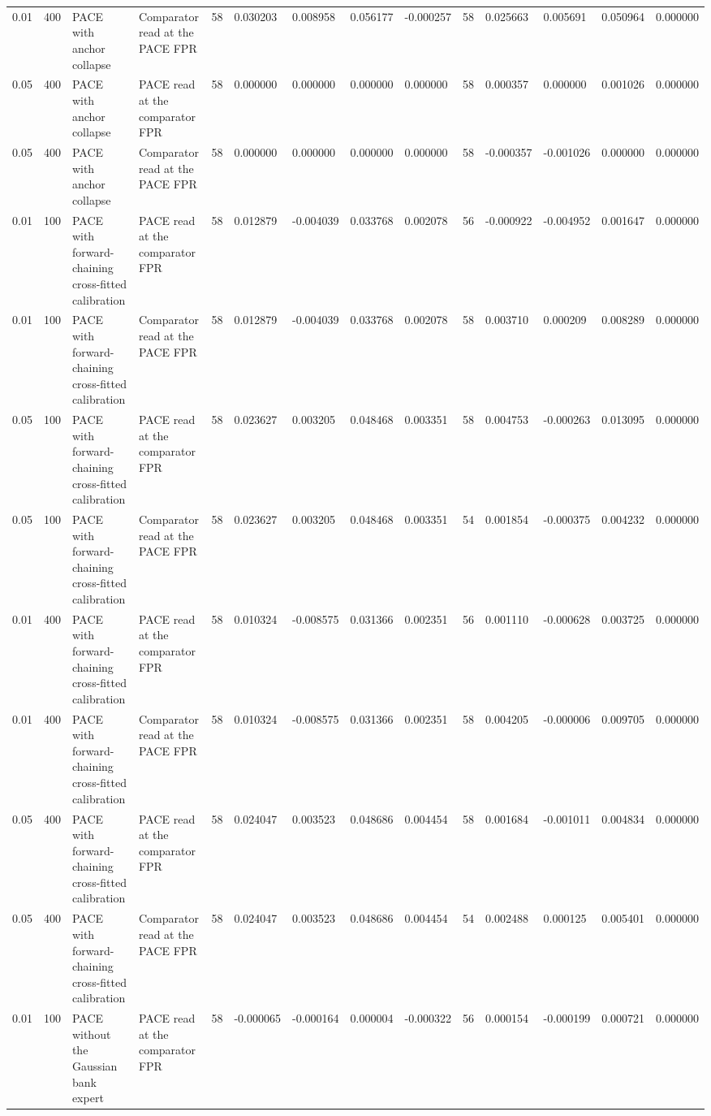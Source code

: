 \begin{tabular}{llllllllllllll}
0.01 & 400 & PACE with anchor collapse & Comparator read at the PACE FPR & 58 & 0.030203 & 0.008958 & 0.056177 & -0.000257 & 58 & 0.025663 & 0.005691 & 0.050964 & 0.000000 \\
0.05 & 400 & PACE with anchor collapse & PACE read at the comparator FPR & 58 & 0.000000 & 0.000000 & 0.000000 & 0.000000 & 58 & 0.000357 & 0.000000 & 0.001026 & 0.000000 \\
0.05 & 400 & PACE with anchor collapse & Comparator read at the PACE FPR & 58 & 0.000000 & 0.000000 & 0.000000 & 0.000000 & 58 & -0.000357 & -0.001026 & 0.000000 & 0.000000 \\
0.01 & 100 & PACE with forward-chaining cross-fitted calibration & PACE read at the comparator FPR & 58 & 0.012879 & -0.004039 & 0.033768 & 0.002078 & 56 & -0.000922 & -0.004952 & 0.001647 & 0.000000 \\
0.01 & 100 & PACE with forward-chaining cross-fitted calibration & Comparator read at the PACE FPR & 58 & 0.012879 & -0.004039 & 0.033768 & 0.002078 & 58 & 0.003710 & 0.000209 & 0.008289 & 0.000000 \\
0.05 & 100 & PACE with forward-chaining cross-fitted calibration & PACE read at the comparator FPR & 58 & 0.023627 & 0.003205 & 0.048468 & 0.003351 & 58 & 0.004753 & -0.000263 & 0.013095 & 0.000000 \\
0.05 & 100 & PACE with forward-chaining cross-fitted calibration & Comparator read at the PACE FPR & 58 & 0.023627 & 0.003205 & 0.048468 & 0.003351 & 54 & 0.001854 & -0.000375 & 0.004232 & 0.000000 \\
0.01 & 400 & PACE with forward-chaining cross-fitted calibration & PACE read at the comparator FPR & 58 & 0.010324 & -0.008575 & 0.031366 & 0.002351 & 56 & 0.001110 & -0.000628 & 0.003725 & 0.000000 \\
0.01 & 400 & PACE with forward-chaining cross-fitted calibration & Comparator read at the PACE FPR & 58 & 0.010324 & -0.008575 & 0.031366 & 0.002351 & 58 & 0.004205 & -0.000006 & 0.009705 & 0.000000 \\
0.05 & 400 & PACE with forward-chaining cross-fitted calibration & PACE read at the comparator FPR & 58 & 0.024047 & 0.003523 & 0.048686 & 0.004454 & 58 & 0.001684 & -0.001011 & 0.004834 & 0.000000 \\
0.05 & 400 & PACE with forward-chaining cross-fitted calibration & Comparator read at the PACE FPR & 58 & 0.024047 & 0.003523 & 0.048686 & 0.004454 & 54 & 0.002488 & 0.000125 & 0.005401 & 0.000000 \\
0.01 & 100 & PACE without the Gaussian bank expert & PACE read at the comparator FPR & 58 & -0.000065 & -0.000164 & 0.000004 & -0.000322 & 56 & 0.000154 & -0.000199 & 0.000721 & 0.000000 \\

\end{tabular}
